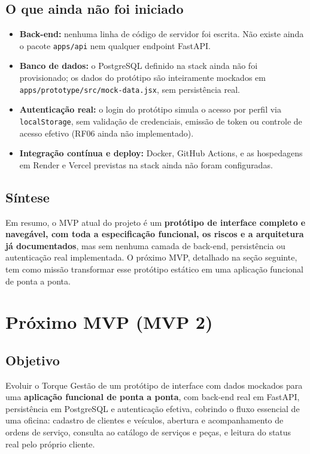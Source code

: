 \documentclass[11pt, a4paper]{article}
\begin{document}
\subsection{O que ainda não foi iniciado}

\begin{itemize}
    \item \textbf{Back-end:} nenhuma linha de código de servidor foi escrita. Não existe ainda o pacote \texttt{apps/api} nem qualquer endpoint FastAPI.
    \item \textbf{Banco de dados:} o PostgreSQL definido na stack ainda não foi provisionado; os dados do protótipo são inteiramente mockados em \texttt{apps/prototype/src/mock-data.jsx}, sem persistência real.
    \item \textbf{Autenticação real:} o login do protótipo simula o acesso por perfil via \texttt{localStorage}, sem validação de credenciais, emissão de token ou controle de acesso efetivo (RF06 ainda não implementado).
    \item \textbf{Integração contínua e deploy:} Docker, GitHub Actions, e as hospedagens em Render e Vercel previstas na stack ainda não foram configuradas.
\end{itemize}

\subsection{Síntese}

Em resumo, o MVP atual do projeto é um \textbf{protótipo de interface completo e navegável, com toda a especificação funcional, os riscos e a arquitetura já documentados}, mas sem nenhuma camada de back-end, persistência ou autenticação real implementada. O próximo MVP, detalhado na seção seguinte, tem como missão transformar esse protótipo estático em uma aplicação funcional de ponta a ponta.

\section{Próximo MVP (MVP 2)}

\subsection{Objetivo}

Evoluir o Torque Gestão de um protótipo de interface com dados mockados para uma \textbf{aplicação funcional de ponta a ponta}, com back-end real em FastAPI, persistência em PostgreSQL e autenticação efetiva, cobrindo o fluxo essencial de uma oficina: cadastro de clientes e veículos, abertura e acompanhamento de ordens de serviço, consulta ao catálogo de serviços e peças, e leitura do status real pelo próprio cliente.
\end{document}
